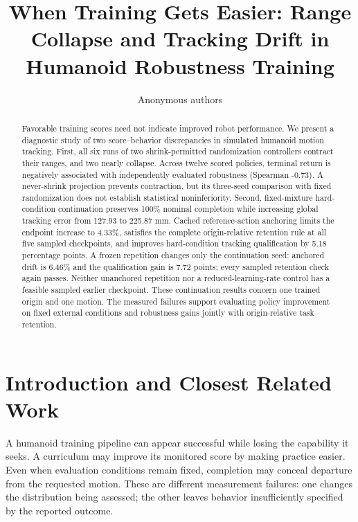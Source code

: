\documentclass[letterpaper,10pt,conference]{ieeeconf}
\title{When Training Gets Easier: Range Collapse and Tracking Drift in Humanoid Robustness Training}
\author{Anonymous authors}
\begin{document}
\maketitle
\thispagestyle{empty}\pagestyle{empty}


\begin{abstract}

Favorable training scores need not indicate improved robot performance. We present a diagnostic study of two score--behavior discrepancies in simulated humanoid motion tracking. First, all six runs of two shrink-permitted randomization controllers contract their ranges, and two nearly collapse. Across twelve scored policies, terminal return is negatively associated with independently evaluated robustness (Spearman -0.73). A never-shrink projection prevents contraction, but its three-seed comparison with fixed randomization does not establish statistical noninferiority. Second, fixed-mixture hard-condition continuation preserves 100\% nominal completion while increasing global tracking error from 127.93 to 225.87 mm. Cached reference-action anchoring limits the endpoint increase to 4.33\%, satisfies the complete origin-relative retention rule at all five sampled checkpoints, and improves hard-condition tracking qualification by 5.18 percentage points. A frozen repetition changes only the continuation seed: anchored drift is 6.46\% and the qualification gain is 7.72 points; every sampled retention check again passes. Neither unanchored repetition nor a reduced-learning-rate control has a feasible sampled earlier checkpoint. These continuation results concern one trained origin and one motion. The measured failures support evaluating policy improvement on fixed external conditions and robustness gains jointly with origin-relative task retention.

\end{abstract}
\section{Introduction and Closest Related Work}

A humanoid training pipeline can appear successful while losing the capability it seeks. A curriculum may improve its monitored score by making practice easier. Even when evaluation conditions remain fixed, completion may conceal departure from the requested motion. These are different measurement failures: one changes the distribution being assessed; the other leaves behavior insufficiently specified by the reported outcome.
\end{document}
